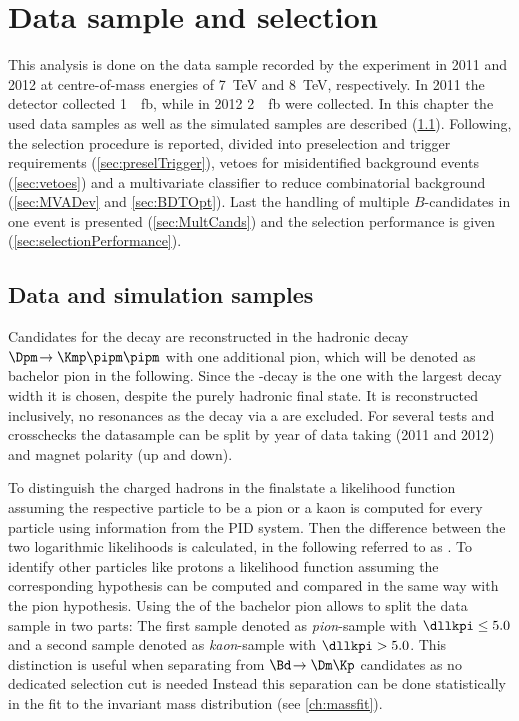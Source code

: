 \chapter{Data sample and selection}

\linespread{1.08}\selectfont
This analysis is done on the data sample recorded by the \lhcb experiment in \num{2011} and \num{2012} at centre-of-mass energies of \SI{7}{\tera\electronvolt} and \SI{8}{\tera\electronvolt}, respectively.
In \num{2011} the detector collected \SI{1}{\per\femto\barn}, while in \num{2012} \SI{2}{\per\femto\barn} were collected.
In this chapter the used data samples as well as the simulated samples are described (\cref{sec:Samples}).
Following, the selection procedure is reported, divided into preselection and trigger requirements (\cref{sec:preselTrigger}), vetoes for \eg misidentified background events (\cref{sec:vetoes}) and a multivariate classifier to reduce combinatorial background (\cref{sec:MVADev} and \cref{sec:BDTOpt}).
Last the handling of multiple $B$-candidates in one event is presented (\cref{sec:MultCands}) and the selection performance is given (\cref{sec:selectionPerformance}).

\section{Data and simulation samples}
\label{sec:Samples}

Candidates for the decay \BdToDpi are reconstructed in the hadronic decay $\Dpm\!\to\Kmp\pipm\pipm$ with one additional pion, which will be denoted as bachelor pion in the following.
Since the \D-decay is the one with the largest decay width it is chosen, despite the purely hadronic final state.
It is reconstructed inclusively, \ie no resonances as the decay via a \Kstarz are excluded.
For several tests and crosschecks the datasample can be split by year of data taking (\num{2011} and \num{2012}) and magnet polarity (up and down).

To distinguish the charged hadrons in the finalstate a likelihood function assuming the respective particle to be a pion or a kaon is computed for every particle using information from the PID system.
Then the difference between the two logarithmic likelihoods is calculated, in the following referred to as \dllkpi.
To identify other particles like protons a likelihood function assuming the corresponding hypothesis can be computed and compared in the same way with the pion hypothesis.
Using the \dllkpi of the bachelor pion allows to split the data sample in two parts: The first sample denoted as \emph{pion}-sample with $\dllkpi\leq5.0$ and a second sample denoted as \emph{kaon}-sample with $\dllkpi>5.0$. This distinction is useful when separating \BdToDpi from $\Bd\!\to\Dm\Kp$ candidates as no dedicated selection cut is needed
Instead this separation can be done statistically in the fit to the invariant mass distribution (see \cref{ch:massfit}).

